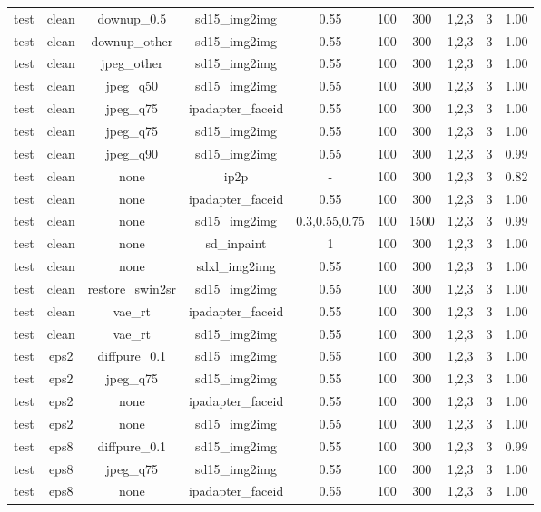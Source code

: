 \begin{table}[t]
{\begin{tabular}{lccccccccc}
test & clean & downup\_0.5 & sd15\_img2img & 0.55 & 100 & 300 & 1,2,3 & 3 & 1.00 \\
test & clean & downup\_other & sd15\_img2img & 0.55 & 100 & 300 & 1,2,3 & 3 & 1.00 \\
test & clean & jpeg\_other & sd15\_img2img & 0.55 & 100 & 300 & 1,2,3 & 3 & 1.00 \\
test & clean & jpeg\_q50 & sd15\_img2img & 0.55 & 100 & 300 & 1,2,3 & 3 & 1.00 \\
test & clean & jpeg\_q75 & ipadapter\_faceid & 0.55 & 100 & 300 & 1,2,3 & 3 & 1.00 \\
test & clean & jpeg\_q75 & sd15\_img2img & 0.55 & 100 & 300 & 1,2,3 & 3 & 1.00 \\
test & clean & jpeg\_q90 & sd15\_img2img & 0.55 & 100 & 300 & 1,2,3 & 3 & 0.99 \\
test & clean & none & ip2p & - & 100 & 300 & 1,2,3 & 3 & 0.82 \\
test & clean & none & ipadapter\_faceid & 0.55 & 100 & 300 & 1,2,3 & 3 & 1.00 \\
test & clean & none & sd15\_img2img & 0.3,0.55,0.75 & 100 & 1500 & 1,2,3 & 3 & 0.99 \\
test & clean & none & sd\_inpaint & 1 & 100 & 300 & 1,2,3 & 3 & 1.00 \\
test & clean & none & sdxl\_img2img & 0.55 & 100 & 300 & 1,2,3 & 3 & 1.00 \\
test & clean & restore\_swin2sr & sd15\_img2img & 0.55 & 100 & 300 & 1,2,3 & 3 & 1.00 \\
test & clean & vae\_rt & ipadapter\_faceid & 0.55 & 100 & 300 & 1,2,3 & 3 & 1.00 \\
test & clean & vae\_rt & sd15\_img2img & 0.55 & 100 & 300 & 1,2,3 & 3 & 1.00 \\
test & eps2 & diffpure\_0.1 & sd15\_img2img & 0.55 & 100 & 300 & 1,2,3 & 3 & 1.00 \\
test & eps2 & jpeg\_q75 & sd15\_img2img & 0.55 & 100 & 300 & 1,2,3 & 3 & 1.00 \\
test & eps2 & none & ipadapter\_faceid & 0.55 & 100 & 300 & 1,2,3 & 3 & 1.00 \\
test & eps2 & none & sd15\_img2img & 0.55 & 100 & 300 & 1,2,3 & 3 & 1.00 \\
test & eps8 & diffpure\_0.1 & sd15\_img2img & 0.55 & 100 & 300 & 1,2,3 & 3 & 0.99 \\
test & eps8 & jpeg\_q75 & sd15\_img2img & 0.55 & 100 & 300 & 1,2,3 & 3 & 1.00 \\
test & eps8 & none & ipadapter\_faceid & 0.55 & 100 & 300 & 1,2,3 & 3 & 1.00 \\

\end{tabular}}
\end{table}

